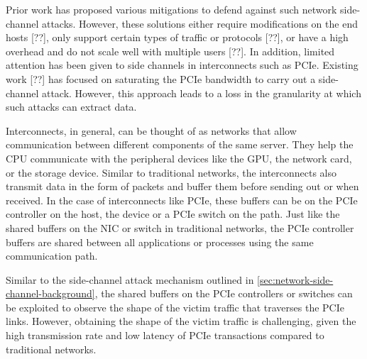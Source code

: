 Prior work has proposed various mitigations to defend against such network side-channel attacks. However, these solutions either require modifications on the end hosts [??], %
only support certain types of traffic or protocols [??], %
or have a high overhead and do not scale well with multiple users [??]. %
In addition, limited attention has been given to side channels in interconnects such as PCIe. 
Existing work [??] has focused on saturating the PCIe bandwidth to carry out a side-channel attack. However, this approach leads to a loss in the granularity at which such attacks can extract data.

Interconnects, in general, can be thought of as networks that allow communication between different components of the same server. 
They help the CPU communicate with the peripheral devices like the GPU, the network card, or the storage device. 
Similar to traditional networks, the interconnects also transmit data in the form of packets and buffer them before sending out or when received.
In the case of interconnects like PCIe, these buffers can be on the PCIe controller on the host, the device or a PCIe switch on the path.
Just like the shared buffers on the NIC or switch in traditional networks, the PCIe controller buffers are shared between all applications or processes using the same communication path.

Similar to the side-channel attack mechanism outlined in \ref{sec:network-side-channel-background}, the shared buffers on the PCIe controllers or switches can be exploited to observe the shape of the victim traffic that traverses the PCIe links.
However, obtaining the shape of the victim traffic is challenging, given the high transmission rate and low latency of PCIe transactions compared to traditional networks.
